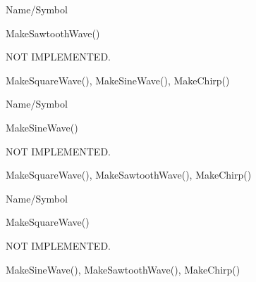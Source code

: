 \rl


\begin{desc}{Name/Symbol}
\item[Name/Symbol]	MakeSawtoothWave()     

\item[Description]	NOT IMPLEMENTED.

\item[Usage]		

\item[Example]	

\item[See Also]	MakeSquareWave(), MakeSineWave(), MakeChirp()
\end{desc}

\rl


\begin{desc}{Name/Symbol}
\item[Name/Symbol]	MakeSineWave()     

\item[Description]	NOT IMPLEMENTED.

\item[Usage]		

\item[Example]	

\item[See Also]	MakeSquareWave(), MakeSawtoothWave(), MakeChirp()
\end{desc}

\rl


\begin{desc}{Name/Symbol}
\item[Name/Symbol]	MakeSquareWave()     

\item[Description]	NOT IMPLEMENTED.

\item[Usage]		

\item[Example]	

\item[See Also]	MakeSineWave(), MakeSawtoothWave(), MakeChirp()
\end{desc}

\rl


